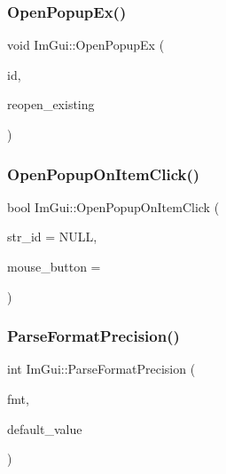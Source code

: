 \hypertarget{namespace_im_gui_a92683a696319581577334d6b798e2f97}{}\label{namespace_im_gui_a92683a696319581577334d6b798e2f97} 
\subsubsection{\texorpdfstring{Open\+Popup\+Ex()}{OpenPopupEx()}}
{\footnotesize\ttfamily void Im\+Gui\+::\+Open\+Popup\+Ex (\begin{DoxyParamCaption}\item[{Im\+Gui\+ID}]{id,  }\item[{bool}]{reopen\+\_\+existing }\end{DoxyParamCaption})}

\hypertarget{namespace_im_gui_a546fc46d8f510cb17a2f272891e2f5b3}{}\label{namespace_im_gui_a546fc46d8f510cb17a2f272891e2f5b3} 
\subsubsection{\texorpdfstring{Open\+Popup\+On\+Item\+Click()}{OpenPopupOnItemClick()}}
{\footnotesize\ttfamily bool Im\+Gui\+::\+Open\+Popup\+On\+Item\+Click (\begin{DoxyParamCaption}\item[{const char $\ast$}]{str\+\_\+id = {\ttfamily NULL},  }\item[{int}]{mouse\+\_\+button = {} }\end{DoxyParamCaption})}

\hypertarget{namespace_im_gui_a40943047a2f8cad978fabffcbd26805f}{}\label{namespace_im_gui_a40943047a2f8cad978fabffcbd26805f} 
\subsubsection{\texorpdfstring{Parse\+Format\+Precision()}{ParseFormatPrecision()}}
{\footnotesize\ttfamily int Im\+Gui\+::\+Parse\+Format\+Precision (\begin{DoxyParamCaption}\item[{const char $\ast$}]{fmt,  }\item[{int}]{default\+\_\+value }\end{DoxyParamCaption})}

